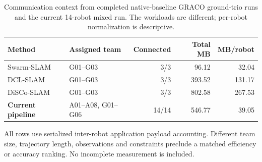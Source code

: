 \begin{table}[htbp]
\centering\small
\caption{Communication context from completed native-baseline GRACO ground-trio runs and the current 14-robot mixed run. The workloads are different; per-robot normalization is descriptive.}
\label{tab:baseline-traffic}
\begin{tabular}{llrrr}
\toprule
Method & Assigned team & Connected & Total MB & MB/robot \\
\midrule
Swarm-SLAM~\cite{swarm} & G01--G03 & 3/3 & 96.12 & 32.04 \\
DCL-SLAM~\cite{dcl} & G01--G03 & 3/3 & 393.52 & 131.17 \\
DiSCo-SLAM~\cite{disco} & G01--G03 & 3/3 & 802.58 & 267.53 \\
\textbf{Current pipeline} & A01--A08, G01--G06 & 14/14 & 546.77 & 39.05 \\
\bottomrule
\end{tabular}
\par\vspace{5pt}\begin{minipage}{0.97\linewidth}\footnotesize All rows use serialized inter-robot application payload accounting. Different team size, trajectory length, observations and constraints preclude a matched efficiency or accuracy ranking. No incomplete measurement is included.\end{minipage}
\end{table}
